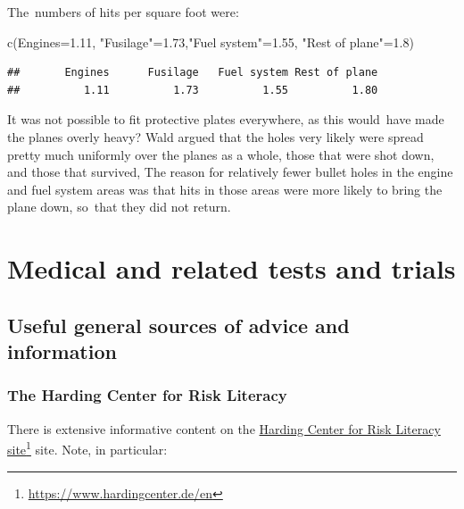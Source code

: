 \documentclass[
  10pt,
  b5paper]{book}
\newenvironment{Shaded}{\begin{snugshade}}{\end{snugshade}}
\newcommand{\FloatTok}[1]{\textcolor[rgb]{0.00,0.00,0.81}{#1}}
\newcommand{\FunctionTok}[1]{\textcolor[rgb]{0.00,0.00,0.00}{#1}}
\newcommand{\NormalTok}[1]{#1}
\newcommand{\OtherTok}[1]{\textcolor[rgb]{0.56,0.35,0.01}{#1}}
\newcommand{\StringTok}[1]{\textcolor[rgb]{0.31,0.60,0.02}{#1}}
\begin{document}
The~numbers of hits per square foot were:

\begin{Shaded}
\begin{Highlighting}[]
\FunctionTok{c}\NormalTok{(}\StringTok{\textquotesingle{}Engines\textquotesingle{}}\OtherTok{=}\FloatTok{1.11}\NormalTok{, }\StringTok{"Fusilage"}\OtherTok{=}\FloatTok{1.73}\NormalTok{,}\StringTok{"Fuel system"}\OtherTok{=}\FloatTok{1.55}\NormalTok{, }\StringTok{"Rest of plane"}\OtherTok{=}\FloatTok{1.8}\NormalTok{)}
\end{Highlighting}
\end{Shaded}

\begin{verbatim}
##       Engines      Fusilage   Fuel system Rest of plane 
##          1.11          1.73          1.55          1.80
\end{verbatim}

It was not possible to fit protective plates everywhere,
as this would~have made the planes overly heavy? Wald argued
that the holes very likely were spread pretty much uniformly
over the planes as a whole, those that were shot down, and those
that survived, The reason for relatively fewer bullet holes in
the engine and fuel system areas was that hits in those areas
were more likely to bring the plane down, so~that they did not
return.

\hypertarget{medical-and-related-tests-and-trials}{%
\chapter{Medical and related tests and trials}\label{medical-and-related-tests-and-trials}}

\hypertarget{useful-general-sources-of-advice-and-information}{%
\section{Useful general sources of advice and information}\label{useful-general-sources-of-advice-and-information}}

\hypertarget{the-harding-center-for-risk-literacy}{%
\subsection*{The Harding Center for Risk Literacy}\label{the-harding-center-for-risk-literacy}}

There is extensive informative content on the \href{https://www.hardingcenter.de/en}{Harding Center for Risk Literacy site}\footnote{\url{https://www.hardingcenter.de/en}} site. Note, in particular:
\end{document}
